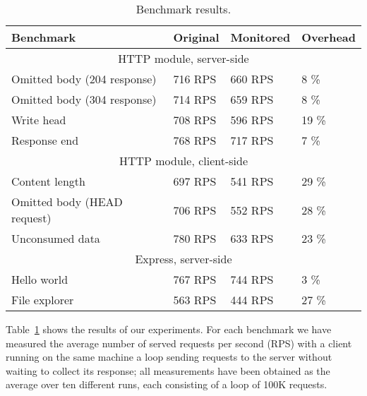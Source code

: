 \begin{table}[ht]
  \begin{tabular}{|l|l|l|l|}
    \hline
    \textbf{Benchmark} &
    \textbf{Original} &
    \textbf{Monitored} &
    \textbf{Overhead} \\
    \hline
    \multicolumn{4}{|c|}{HTTP module, server-side}\\
    \hline

    Omitted body (204 response)&
    716 RPS &
    660 RPS &
    8 \% \\

    Omitted body (304 response)&
    714 RPS &
    659 RPS &
    8 \% \\

    Write head &
    708 RPS &
    596 RPS &
    19 \% \\

    Response end &
    768 RPS &
    717 RPS &
    7 \% \\

    \hline

    \multicolumn{4}{|c|}{HTTP module, client-side}\\
    \hline

    Content length &
    697 RPS &
    541 RPS &
    29 \% \\

    Omitted body (HEAD request)&
    706 RPS &
    552 RPS &
    28 \% \\

    Unconsumed data &
     780 RPS &
     633 RPS &
     23 \% \\

     \hline
    \multicolumn{4}{|c|}{Express, server-side}\\
    \hline
    Hello world &
    767 RPS &
    744 RPS &
    3 \% \\

    File explorer &
    563 RPS &
    444 RPS &
    27 \%\\

    \hline
  \end{tabular}
  \caption{Benchmark results.}
  \label{table}
\end{table}
\vspace{-1em}
Table~\ref{table} shows the results of our experiments.
For each benchmark we have measured the average number of served requests per second (RPS)
with a client running on the same machine a loop sending requests to the server without waiting to collect its response;
all measurements have been obtained as the average over ten different runs, each consisting
of a loop of 100K requests.

